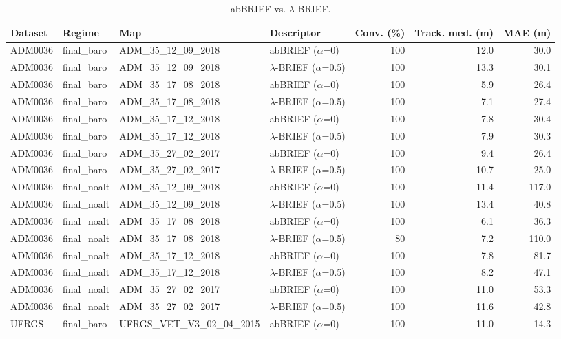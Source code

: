 \begin{table}[t]
\centering
\caption{abBRIEF vs. $\lambda$-BRIEF.}
\begin{tabular}{llllrrr}
\toprule
Dataset & Regime & Map & Descriptor & Conv. (\%) & Track. med. (m) & MAE (m) \\
\midrule
ADM0036 & final_baro & ADM\_35\_12\_09\_2018 & abBRIEF ($\alpha$=0) & 100 & 12.0 & 30.0 \\
ADM0036 & final_baro & ADM\_35\_12\_09\_2018 & $\lambda$-BRIEF ($\alpha$=0.5) & 100 & 13.3 & 30.1 \\
ADM0036 & final_baro & ADM\_35\_17\_08\_2018 & abBRIEF ($\alpha$=0) & 100 & 5.9 & 26.4 \\
ADM0036 & final_baro & ADM\_35\_17\_08\_2018 & $\lambda$-BRIEF ($\alpha$=0.5) & 100 & 7.1 & 27.4 \\
ADM0036 & final_baro & ADM\_35\_17\_12\_2018 & abBRIEF ($\alpha$=0) & 100 & 7.8 & 30.4 \\
ADM0036 & final_baro & ADM\_35\_17\_12\_2018 & $\lambda$-BRIEF ($\alpha$=0.5) & 100 & 7.9 & 30.3 \\
ADM0036 & final_baro & ADM\_35\_27\_02\_2017 & abBRIEF ($\alpha$=0) & 100 & 9.4 & 26.4 \\
ADM0036 & final_baro & ADM\_35\_27\_02\_2017 & $\lambda$-BRIEF ($\alpha$=0.5) & 100 & 10.7 & 25.0 \\
ADM0036 & final_noalt & ADM\_35\_12\_09\_2018 & abBRIEF ($\alpha$=0) & 100 & 11.4 & 117.0 \\
ADM0036 & final_noalt & ADM\_35\_12\_09\_2018 & $\lambda$-BRIEF ($\alpha$=0.5) & 100 & 13.4 & 40.8 \\
ADM0036 & final_noalt & ADM\_35\_17\_08\_2018 & abBRIEF ($\alpha$=0) & 100 & 6.1 & 36.3 \\
ADM0036 & final_noalt & ADM\_35\_17\_08\_2018 & $\lambda$-BRIEF ($\alpha$=0.5) & 80 & 7.2 & 110.0 \\
ADM0036 & final_noalt & ADM\_35\_17\_12\_2018 & abBRIEF ($\alpha$=0) & 100 & 7.8 & 81.7 \\
ADM0036 & final_noalt & ADM\_35\_17\_12\_2018 & $\lambda$-BRIEF ($\alpha$=0.5) & 100 & 8.2 & 47.1 \\
ADM0036 & final_noalt & ADM\_35\_27\_02\_2017 & abBRIEF ($\alpha$=0) & 100 & 11.0 & 53.3 \\
ADM0036 & final_noalt & ADM\_35\_27\_02\_2017 & $\lambda$-BRIEF ($\alpha$=0.5) & 100 & 11.6 & 42.8 \\
UFRGS & final_baro & UFRGS\_VET\_V3\_02\_04\_2015 & abBRIEF ($\alpha$=0) & 100 & 11.0 & 14.3 \\

\end{tabular}
\end{table}

